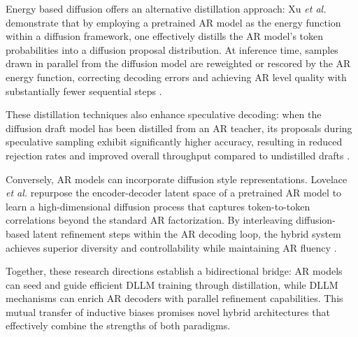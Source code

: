 


Energy based diffusion offers an alternative distillation approach: %
Xu \emph{et al.} demonstrate that by employing a pretrained AR model as the energy function within a diffusion framework, one effectively distills the AR model's token probabilities into a diffusion proposal distribution. %
At inference time, samples drawn in parallel from the diffusion model are reweighted or rescored by the AR energy function, correcting decoding errors and achieving AR level quality with substantially fewer sequential steps \cite{xu_energy-based_2025}.

These distillation techniques also enhance speculative decoding: when the diffusion draft model has been distilled from an AR teacher, its proposals during speculative sampling exhibit significantly higher accuracy, resulting in reduced rejection rates and improved overall throughput compared to undistilled drafts \cite{christopher_speculative_2025}.

Conversely, AR models can incorporate diffusion style representations. %
Lovelace \emph{et al.} repurpose the encoder-decoder latent space of a pretrained AR model to learn a high-dimensional diffusion process that captures token-to-token correlations beyond the standard AR factorization. %
By interleaving diffusion-based latent refinement steps within the AR decoding loop, the hybrid system achieves superior diversity and controllability while maintaining AR fluency \cite{lovelace_latent_2023}.

Together, these research directions establish a bidirectional bridge: %
AR models can seed and guide efficient DLLM training through distillation, %
while DLLM mechanisms can enrich AR decoders with parallel refinement capabilities. %
This mutual transfer of inductive biases promises novel hybrid architectures that effectively combine the strengths of both paradigms.

% 
% 
